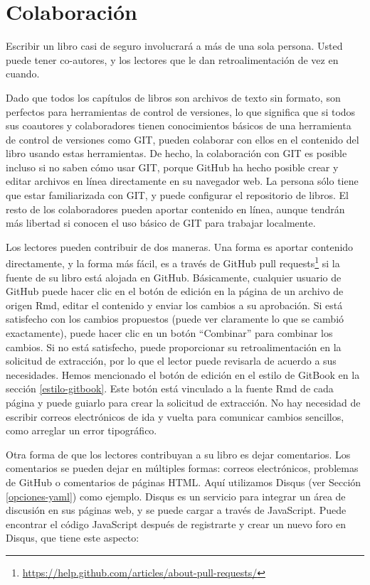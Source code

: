 \documentclass[12pt,]{krantz}
\renewcommand{\href}[2]{#2\footnote{\url{#1}}}
\theoremstyle{definition}
\theoremstyle{definition}
\theoremstyle{remark}
\begin{document}
\section{Colaboración}\label{colaboracion}

Escribir un libro casi de seguro involucrará a más de una sola persona.
Usted puede tener co-autores, y los lectores que le dan
retroalimentación de vez en cuando.

Dado que todos los capítulos de libros son archivos de texto sin
formato, son perfectos para herramientas de control de versiones, lo que
significa que si todos sus coautores y colaboradores tienen
conocimientos básicos de una herramienta de control de versiones como
GIT, pueden colaborar con ellos en el contenido del libro usando estas
herramientas. De hecho, la colaboración con GIT es posible incluso si no
saben cómo usar GIT, porque GitHub  ha hecho posible crear
y editar archivos en línea directamente en su navegador web. La persona
sólo tiene que estar familiarizada con GIT, y puede configurar el
repositorio de libros. El resto de los colaboradores pueden aportar
contenido en línea, aunque tendrán más libertad si conocen el uso básico
de GIT para trabajar localmente.

Los lectores pueden contribuir de dos maneras. Una forma es aportar
contenido directamente, y la forma más fácil, es a través de
\href{https://help.github.com/articles/about-pull-requests/}{GitHub pull
requests} si la fuente de su libro está alojada en GitHub. Básicamente,
cualquier usuario de GitHub puede hacer clic en el botón de edición en
la página de un archivo de origen Rmd, editar el contenido y enviar los
cambios a su aprobación. Si está satisfecho con los cambios propuestos
(puede ver claramente lo que se cambió exactamente), puede hacer clic en
un botón ``Combinar'' para combinar los cambios. Si no está satisfecho,
puede proporcionar su retroalimentación en la solicitud de extracción,
por lo que el lector puede revisarla de acuerdo a sus necesidades. Hemos
mencionado el botón de edición en el estilo de GitBook en la sección
\ref{estilo-gitbook}. Este botón está vinculado a la fuente Rmd de cada
página y puede guiarlo para crear la solicitud de extracción. No hay
necesidad de escribir correos electrónicos de ida y vuelta para
comunicar cambios sencillos, como arreglar un error tipográfico.

Otra forma de que los lectores contribuyan a su libro es dejar
comentarios. Los comentarios se pueden dejar en múltiples formas:
correos electrónicos, problemas de GitHub o comentarios de páginas HTML.
Aquí utilizamos Disqus (ver Sección \ref{opciones-yaml}) como ejemplo.
Disqus es un servicio para integrar un área de discusión en sus páginas
web, y se puede cargar a través de JavaScript. Puede encontrar el código
JavaScript después de registrarte y crear un nuevo foro en Disqus, que
tiene este aspecto:
\end{document}
